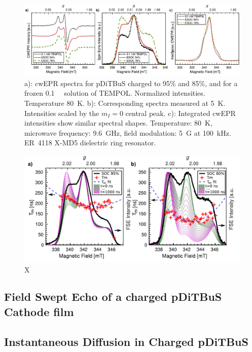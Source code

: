 \begin{figure}[h]
\center
	\includegraphics[width=1\textwidth]{./pulse/figures/Figure_3_INTS.pdf}
	\caption{a): cwEPR spectra for pDiTBuS charged to 95\% and 85\%, and for a frozen 0.1~\si{\milli\Molar}  solution of TEMPOL. Normalized intensities. Temperature 80~K. b): Corresponding  spectra measured at 5~K. Intensities scaled by the $m_I=0$ central peak. c): Integrated cwEPR intensities show similar spectral shapes. Temperature: 80~K, microwave frequency: 9.6~GHz, field modulation: 5~G at 100~kHz. ER~4118 X-MD5 dielectric ring resonator.}
	\label{fig:FSE_vs_CW_vs_INTS_DiTBuS}
\end{figure}


\begin{figure}[h]
\center
	\includegraphics[width=1\textwidth]{./pulse/figures/Figure_6_maintext_col_MOD.pdf}
	\caption{X}
	\label{fig:FSE_reconstruction_with_T2}
\end{figure}



\subsection{Field Swept Echo of a charged pDiTBuS Cathode film}


\subsection{Instantaneous Diffusion in Charged pDiTBuS}
\label{S:ID}


